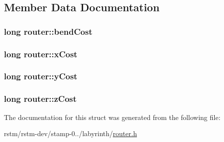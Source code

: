 \subsection{Member Data Documentation}
\hypertarget{structrouter_a18f9e16333db17fda42e0669b79614db}{
\subsubsection[{bend\-Cost}]{\setlength{\rightskip}{0pt plus 5cm}long router\-::bend\-Cost}}\label{structrouter_a18f9e16333db17fda42e0669b79614db}
\hypertarget{structrouter_adf1906b1272423e7e652154c78e62527}{
\subsubsection[{x\-Cost}]{\setlength{\rightskip}{0pt plus 5cm}long router\-::x\-Cost}}\label{structrouter_adf1906b1272423e7e652154c78e62527}
\hypertarget{structrouter_a0f42dd778fc3675ee11bc7cf366f1ee3}{
\subsubsection[{y\-Cost}]{\setlength{\rightskip}{0pt plus 5cm}long router\-::y\-Cost}}\label{structrouter_a0f42dd778fc3675ee11bc7cf366f1ee3}
\hypertarget{structrouter_aad40f5f96b8fc60350a5577104984c3b}{
\subsubsection[{z\-Cost}]{\setlength{\rightskip}{0pt plus 5cm}long router\-::z\-Cost}}\label{structrouter_aad40f5f96b8fc60350a5577104984c3b}


The documentation for this struct was generated from the following file\-:\begin{DoxyCompactItemize}
\item 
rstm/rstm-\/dev/stamp-\/0../labyrinth/\hyperlink{router_8h}{router.\-h}\end{DoxyCompactItemize}
